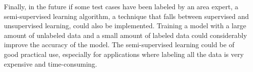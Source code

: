 Finally, in the future if some test cases have been labeled by an
area expert, a semi-supervised learning algorithm, a technique that
falls between supervised and unsupervised learning, could also be
implemented. Training a model with a large amount of unlabeled data
and a small amount of labeled data could considerably improve the
accuracy of the model. The semi-supervised learning could be of good
practical use, especially for applications where labeling all the
data is very expensive and time-consuming. 


